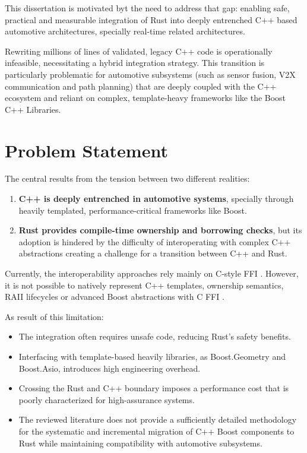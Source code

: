 This dissertation is motivated byt the need to address that gap: 
enabling safe, practical and measurable integration of Rust into deeply entrenched C++ based automotive architectures, 
specially real-time related architectures.

Rewriting millions of lines of validated, legacy C++ code is operationally infeasible, 
necessitating a hybrid integration strategy. 
This transition is particularly problematic for automotive subsystems (such as sensor fusion, V2X communication and path planning) 
that are deeply coupled with the C++ ecosystem and reliant on complex, template-heavy frameworks like the Boost C++ Libraries.


\section{Problem Statement} 
\label{sec:problem_statement} %

The central results from the tension between two different realities:
\begin{enumerate}
    \item \textbf{C++ is deeply entrenched in automotive systems}, specially through heavily templated, performance-critical frameworks like Boost.
    \item  \textbf{Rust provides compile-time ownership and borrowing checks}, but its adoption is hindered by the difficulty of interoperating with complex C++ abstractions creating a challenge for a transition between C++ and Rust. 
\end{enumerate} 

Currently, the interoperability approaches rely mainly on C-style \gls{FFI} . 
However, it is not possible to natively represent C++ templates, ownership semantics, 
RAII lifecycles or advanced Boost abstractions with C \gls{FFI} \parencite{CrubitDesign}.

As result of this limitation:
\begin{itemize}
    \item The integration often requires unsafe code, reducing Rust's safety benefits.
    \item Interfacing with template-based heavily libraries, as Boost.Geometry and Boost.Asio, introduces high engineering overhead.
    \item Crossing the Rust and C++ boundary imposes a performance cost that is poorly characterized for high-assurance systems.
    \item The reviewed literature does not provide a sufficiently detailed methodology for the systematic and incremental migration of C++ Boost components to Rust while maintaining compatibility with automotive subsystems.
\end{itemize}

